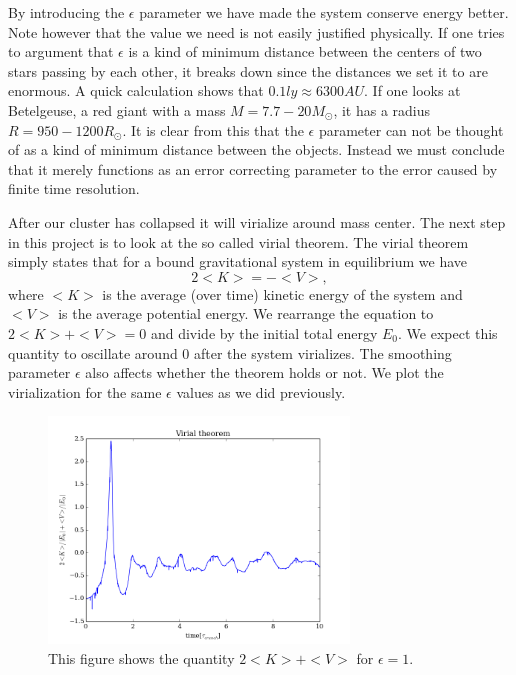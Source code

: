 \documentclass{aa}   %
\begin{document}
By introducing the $\epsilon$ parameter we have made the system conserve energy better. Note however that the value we need is not easily justified physically. If one tries to argument that $\epsilon$ is a kind of minimum distance between the centers of two stars passing by each other, it breaks down since the distances we set it to are enormous. A quick calculation shows that $0.1 ly \approx 6300 AU$. If one looks at Betelgeuse, a red giant with a mass $M = 7.7-20 M_\odot$, it has a radius $R= 950-1200 R_\odot$. It is clear from this that the $\epsilon$ parameter can not be thought of as a kind of minimum distance between the objects. Instead we must conclude that it merely functions as an error correcting parameter to the error caused by finite time resolution. 

After our cluster has collapsed it will virialize around mass center.
The next step in this project is to look at the so called virial theorem.
The virial theorem simply states that for a bound gravitational system in equilibrium we have 
\begin{equation}
 2<K> = -<V>,
\end{equation}
where $<K>$ is the average (over time) kinetic energy of the system and $<V>$ is the average potential energy. We rearrange the equation to $2<K> + <V> = 0$ and divide by the initial total energy $E_0$. We expect this quantity to oscillate around 0 after the system virializes.
The smoothing parameter $\epsilon$ also affects whether the  theorem holds or not. We plot the virialization for the same $\epsilon$ values as we did previously. 

\begin{figure}[hbtp]
 \centering
 \includegraphics[width=80mm]{Virial_N100_10Tcrunch_dt0_001_epsilon1.png}
 \caption[]{\label{Virial_N100_10Tcrunch_dt0_001_epsilon1}
   This figure shows the quantity $2<K> + <V>$ for $\epsilon = 1$.
 }
\end{figure}
\end{document}
